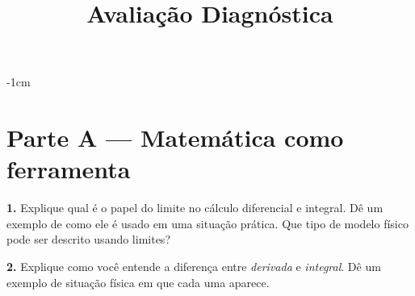 \newif\ifuseseminar
\useseminartrue


\title{Avaliação Diagnóstica}

\geometry{margin=2.5cm}
\hypersetup{hidelinks}
\pagestyle{fancy}
\fancyhf{}

\setlength{\parindent}{0pt}
\setlength{\parskip}{0.5em}

\titlespacing*{\section}{0pt}{0.6em}{0.3em}
\titlespacing*{\subsection}{0pt}{0.5em}{0.2em}

\newcommand{\answerlines}[1]{%
  \vspace*{#1}
}

\newenvironment{instructions}{%
  \begin{center}
    \setlength{\fboxsep}{8pt}%
    \fbox{\begin{minipage}{0.95\linewidth}\small
}{%
    \end{minipage}}%
  \end{center}
}



\vspace{-1cm}

\section*{Parte A — Matemática como ferramenta}

\textbf{1.} Explique qual é o papel do limite no cálculo diferencial e integral. Dê um
exemplo de como ele é usado em uma situação prática. Que tipo de modelo físico pode
ser descrito usando limites?

\answerlines{3.2cm}

\textbf{2.} Explique como você entende a diferença entre \textit{derivada} e
\textit{integral}. Dê um exemplo de situação física em que cada uma aparece.

